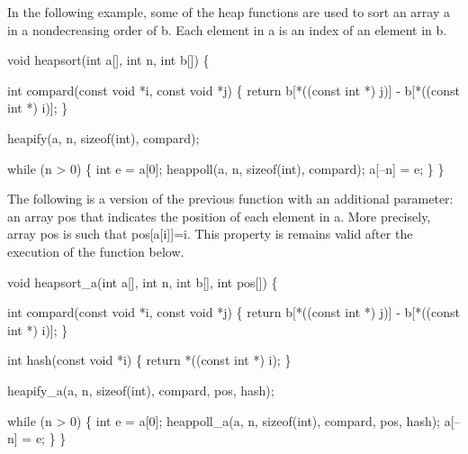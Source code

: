 In the following example, some of the heap functions are used to sort an array {\ttfamily a} in a nondecreasing order of {\ttfamily b}. Each element in {\ttfamily a} is an index of an element in {\ttfamily b}.


\begin{DoxyCode}
\textcolor{keywordtype}{void} heapsort(\textcolor{keywordtype}{int} a[], \textcolor{keywordtype}{int} n, \textcolor{keywordtype}{int} b[]) \{

  \textcolor{keywordtype}{int} compard(\textcolor{keyword}{const} \textcolor{keywordtype}{void} *i, \textcolor{keyword}{const} \textcolor{keywordtype}{void} *j) \{
    \textcolor{keywordflow}{return} b[*((\textcolor{keyword}{const} \textcolor{keywordtype}{int} *) j)] - b[*((\textcolor{keyword}{const} \textcolor{keywordtype}{int} *) i)];
  \}

  heapify(a, n, \textcolor{keyword}{sizeof}(\textcolor{keywordtype}{int}), compard);

  \textcolor{keywordflow}{while} (n > 0) \{
    \textcolor{keywordtype}{int} e = a[0];
    heappoll(a, n, \textcolor{keyword}{sizeof}(\textcolor{keywordtype}{int}), compard);
    a[--n] = e;
  \}
\}
\end{DoxyCode}


The following is a version of the previous function with an additional parameter\+: an array {\ttfamily pos} that indicates the position of each element in {\ttfamily a}. More precisely, array {\ttfamily pos} is such that {\ttfamily pos}[a[i]]=i. This property is remains valid after the execution of the function below.


\begin{DoxyCode}
\textcolor{keywordtype}{void} heapsort\_a(\textcolor{keywordtype}{int} a[], \textcolor{keywordtype}{int} n, \textcolor{keywordtype}{int} b[], \textcolor{keywordtype}{int} pos[]) \{

  \textcolor{keywordtype}{int} compard(\textcolor{keyword}{const} \textcolor{keywordtype}{void} *i, \textcolor{keyword}{const} \textcolor{keywordtype}{void} *j) \{
    \textcolor{keywordflow}{return} b[*((\textcolor{keyword}{const} \textcolor{keywordtype}{int} *) j)] - b[*((\textcolor{keyword}{const} \textcolor{keywordtype}{int} *) i)];
  \}

  \textcolor{keywordtype}{int} hash(\textcolor{keyword}{const} \textcolor{keywordtype}{void} *i) \{
        \textcolor{keywordflow}{return} *((\textcolor{keyword}{const} \textcolor{keywordtype}{int} *) i);
  \}

  heapify_a(a, n, \textcolor{keyword}{sizeof}(\textcolor{keywordtype}{int}), compard, pos, hash);

  \textcolor{keywordflow}{while} (n > 0) \{
    \textcolor{keywordtype}{int} e = a[0];
    heappoll_a(a, n, \textcolor{keyword}{sizeof}(\textcolor{keywordtype}{int}), compard, pos, hash);
    a[--n] = e;
  \}
\}
\end{DoxyCode}
 

